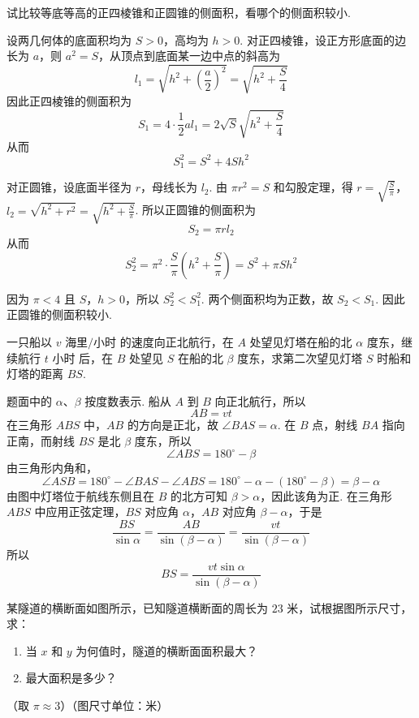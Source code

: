 \begin{problem}
试比较等底等高的正四棱锥和正圆锥的侧面积，看哪个的侧面积较小.
\end{problem}

\begin{solution}
设两几何体的底面积均为 \(S>0\)，高均为 \(h>0\). 对正四棱锥，设正方形底面的边长为 \(a\)，则 \(a^2=S\)，从顶点到底面某一边中点的斜高为
\[
l_1=\sqrt{h^2+\left( \frac{a}{2} \right)^2}=\sqrt{h^2+\frac{S}{4}}
\]
因此正四棱锥的侧面积为
\[
S_1=4\cdot\frac{1}{2}a l_1
=2\sqrt{S}\sqrt{h^2+\frac{S}{4}}
\]
从而
\[
S_1^2=S^2+4Sh^2
\]

对正圆锥，设底面半径为 \(r\)，母线长为 \(l_2\). 由 \(\pi r^2=S\) 和勾股定理，得
\(r=\sqrt{\frac{S}{\pi}}\)，\(l_2=\sqrt{h^2+r^2}=\sqrt{h^2+\frac{S}{\pi}}\).
所以正圆锥的侧面积为
\[
S_2=\pi r l_2
\]
从而
\[
S_2^2=\pi^2\cdot\frac{S}{\pi}\left( h^2+\frac{S}{\pi} \right)=S^2+\pi Sh^2
\]

因为 \(\pi<4\) 且 \(S\)，\(h>0\)，所以 \(S_2^2<S_1^2\). 两个侧面积均为正数，故 \(S_2<S_1\). 因此正圆锥的侧面积较小.
\end{solution}

\begin{problem}
一只船以 \(v\text{ 海里/小时}\) 的速度向正北航行，在 \(A\) 处望见灯塔在船的北 \(\alpha\) 度东，继续航行 \(t\text{ 小时}\) 后，在 \(B\) 处望见 \(S\) 在船的北 \(\beta\) 度东，求第二次望见灯塔 \(S\) 时船和灯塔的距离 \(BS\).
\end{problem}

\begin{solution}

题面中的 \(\alpha\)、\(\beta\) 按度数表示.
船从 \(A\) 到 \(B\) 向正北航行，所以
\[
AB=vt
\]
在三角形 \(ABS\) 中，\(AB\) 的方向是正北，故 \(\angle BAS=\alpha\). 在 \(B\) 点，射线 \(BA\) 指向正南，而射线 \(BS\) 是北 \(\beta\) 度东，所以
\[
\angle ABS=180^\circ-\beta
\]
由三角形内角和，
\[
\angle ASB=180^\circ-\angle BAS-\angle ABS
=180^\circ-\alpha-\left( 180^\circ-\beta \right)=\beta-\alpha
\]
由图中灯塔位于航线东侧且在 \(B\) 的北方可知 \(\beta>\alpha\)，因此该角为正. 在三角形 \(ABS\) 中应用正弦定理，\(BS\) 对应角 \(\alpha\)，\(AB\) 对应角 \(\beta-\alpha\)，于是
\[
\frac{BS}{\sin\alpha}=\frac{AB}{\sin\left( \beta-\alpha \right)}
=\frac{vt}{\sin\left( \beta-\alpha \right)}
\]
所以
\[
BS=\frac{vt\sin\alpha}{\sin\left( \beta-\alpha \right)}
\]
\end{solution}

\begin{problem}
某隧道的横断面如图所示，已知隧道横断面的周长为 \(23\text{ 米}\)，试根据图所示尺寸，求：

\begin{enumerate}
\item 当 \(x\) 和 \(y\) 为何值时，隧道的横断面面积最大？
\item 最大面积是多少？
\end{enumerate}

（取 \(\pi\approx3\)）（图尺寸单位：米）

\end{problem}

